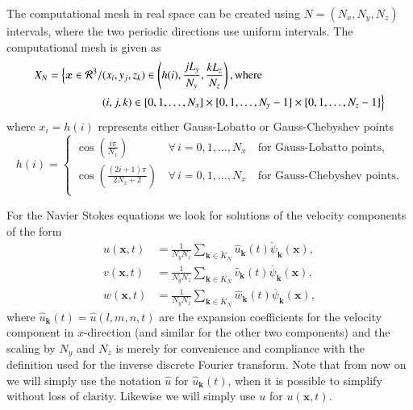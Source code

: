 \documentclass[11pt, oneside]{elsarticle}
\newcommand{\N}[1]{\check{#1}}
\newcommand{\D}[1]{\overline{#1}}
\begin{document}
The computational mesh in real space can be created using $N = (N_x, N_y, 
N_z)$ intervals, where the two periodic directions use uniform intervals. The 
computational mesh is given as
\begin{align}
  X_N = \Big\{ \bm{x} \in \mathcal{R}^3/&(x_i, y_j, z_k) \in \left( h(i), \frac{jL_y}{N_y}, \frac{kL_z}{N_z} \right), \text{where} \notag \\
  &(i, j, k) \in [0, 1, \ldots, N_x] \times [0, 1, \ldots, N_y-1] \times [0, 1, \ldots, N_z-1] \Big\} \label{eq:Xn}
\end{align}
where $x_i = h(i)$ represents either Gauss-Lobatto or Gauss-Chebyshev points
\begin{equation}
 h(i) = \begin{cases}
   \cos \left(\frac{i \pi }{N_x} \right) \, &\forall \, i=0,1, \ldots, N_x \quad  \text{for Gauss-Lobatto points}, \\
   \cos \left(\frac{(2i +1)\pi}{2N_x+2} \right) \, &\forall \, i=0,1, \ldots, N_x \quad  \text{for Gauss-Chebyshev points}. \\
 \end{cases}
\end{equation}

For the Navier Stokes equations we look for solutions of the velocity 
components of the form
\begin{align}
u(\bm{x}, t) &= \frac{1}{N_yN_z}\sum_{\bm{k} \in \N{K}_N} \hat{u}_{\bm{k}}(t) 
\N{\psi}_{\bm{k}}(\bm{x}), \label{eq:u_solx} \\
v(\bm{x}, t) &= \frac{1}{N_yN_z}\sum_{\bm{k} \in \D{K}_N} \hat{v}_{\bm{k}}(t) 
\D{\psi}_{\bm{k}}(\bm{x}), \label{eq:u_soly} \\
w(\bm{x}, t) &= \frac{1}{N_yN_z}\sum_{\bm{k} \in \D{K}_N} \hat{w}_{\bm{k}}(t) 
\D{\psi}_{\bm{k}}(\bm{x}), \label{eq:u_solz}
\end{align}
where $\hat{u}_{\bm{k}}(t) = \hat{u}(l, {m}, {n}, t)$ are the expansion 
coefficients for the velocity component in $x$-direction (and similar for the 
other two components) and the scaling by $N_y$ and $N_z$ is merely for 
convenience 
and compliance with the definition used for the inverse discrete Fourier 
transform. Note that from now on we will simply use the notation $\hat{u}$ for 
$\hat{u}_{\bm{k}}(t)$, when it is possible to simplify without loss of clarity. 
Likewise we will simply use $u$ for $u(\bm{x}, t)$. 
\end{document}
